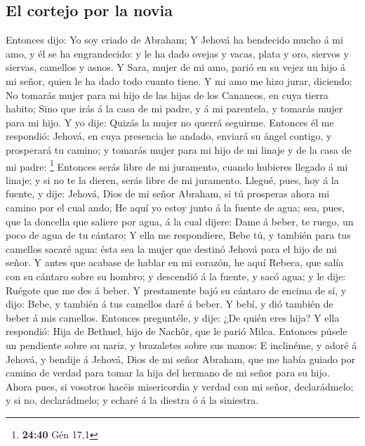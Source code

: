 \hypertarget{el-cortejo-por-la-novia}{%
\subsection{El cortejo por la novia}\label{el-cortejo-por-la-novia}}

 Entonces dijo: Yo soy criado de Abraham; 
Y Jehová ha bendecido mucho á mi amo, y él se ha engrandecido: y le ha
dado ovejas y vacas, plata y oro, siervos y siervas, camellos y asnos.
 Y Sara, mujer de mi amo, parió en su vejez un hijo á mi
señor, quien le ha dado todo cuanto tiene.  Y mi amo me
hizo jurar, diciendo: No tomarás mujer para mi hijo de las hijas de los
Cananeos, en cuya tierra habito;  Sino que irás á la casa
de mi padre, y á mi parentela, y tomarás mujer para mi hijo.
 Y yo dije: Quizás la mujer no querrá seguirme.
 Entonces él me respondió: Jehová, en cuya presencia he
andado, enviará su ángel contigo, y prosperará tu camino; y tomarás
mujer para mi hijo de mi linaje y de la casa de mi padre: \footnote{\textbf{24:40}
  Gén 17,1}  Entonces serás libre de mi juramento, cuando
hubieres llegado á mi linaje; y si no te la dieren, serás libre de mi
juramento.  Llegué, pues, hoy á la fuente, y dije:
Jehová, Dios de mi señor Abraham, si tú prosperas ahora mi camino por el
cual ando;  He aquí yo estoy junto á la fuente de agua;
sea, pues, que la doncella que saliere por agua, á la cual dijere: Dame
á beber, te ruego, un poco de agua de tu cántaro;  Y ella
me respondiere, Bebe tú, y también para tus camellos sacaré agua: ésta
sea la mujer que destinó Jehová para el hijo de mi señor.
 Y antes que acabase de hablar en mi corazón, he aquí
Rebeca, que salía con su cántaro sobre su hombro; y descendió á la
fuente, y sacó agua; y le dije: Ruégote que me des á beber.
 Y prestamente bajó su cántaro de encima de sí, y dijo:
Bebe, y también á tus camellos daré á beber. Y bebí, y dió también de
beber á mis camellos.  Entonces preguntéle, y dije: ¿De
quién eres hija? Y ella respondió: Hija de Bethuel, hijo de Nachôr, que
le parió Milca. Entonces púsele un pendiente sobre su nariz, y
brazaletes sobre sus manos:  E inclinéme, y adoré á
Jehová, y bendije á Jehová, Dios de mi señor Abraham, que me había
guiado por camino de verdad para tomar la hija del hermano de mi señor
para su hijo.  Ahora pues, si vosotros hacéis
misericordia y verdad con mi señor, declarádmelo; y si no, declarádmelo;
y echaré á la diestra ó á la siniestra.

